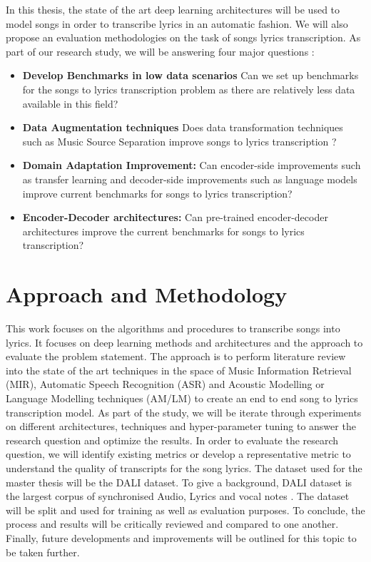 In this thesis, the state of the art deep learning architectures will be used to model songs in order to transcribe lyrics in an automatic fashion. We will also propose an evaluation methodologies on the task of songs lyrics transcription. As part of our research study, we will be answering four major questions : 

\begin{itemize}
    \item \textbf{Develop Benchmarks in low data scenarios} Can we set up benchmarks for the songs to lyrics transcription problem as there are relatively less data available in this field?
    \item \textbf{Data Augmentation techniques} Does data transformation techniques such as Music Source Separation improve songs to lyrics transcription ?
    \item \textbf{Domain Adaptation Improvement:} Can encoder-side improvements such as transfer learning and decoder-side improvements such as language models improve current benchmarks for songs to lyrics transcription?
    \item \textbf{Encoder-Decoder architectures:} Can pre-trained encoder-decoder architectures improve the current benchmarks for songs to lyrics transcription?

\end{itemize}

\section{Approach and Methodology}

This work focuses on the algorithms and procedures to transcribe songs into lyrics. It focuses on deep learning methods and architectures and the approach to evaluate the problem statement. The approach is to perform literature review into the state of the art techniques in the space of Music Information Retrieval (MIR), Automatic Speech Recognition (ASR) and Acoustic Modelling or Language Modelling techniques (AM/LM) to create an end to end song to lyrics transcription model. As part of the study, we will be iterate through experiments on different architectures, techniques and hyper-parameter tuning to answer the research question and optimize the results. In order to evaluate the research question, we will identify existing metrics or develop a representative metric to understand the quality of transcripts for the song lyrics. The dataset used for the master thesis will be the DALI dataset. To give a background, DALI dataset is the largest corpus of  synchronised Audio, Lyrics and vocal notes \cite{meseguer2020creating}. The dataset will be split and used for training as well as evaluation purposes. To conclude, the process and results will be critically reviewed and compared to one another. Finally, future developments and improvements will be outlined for this topic to be taken further. 